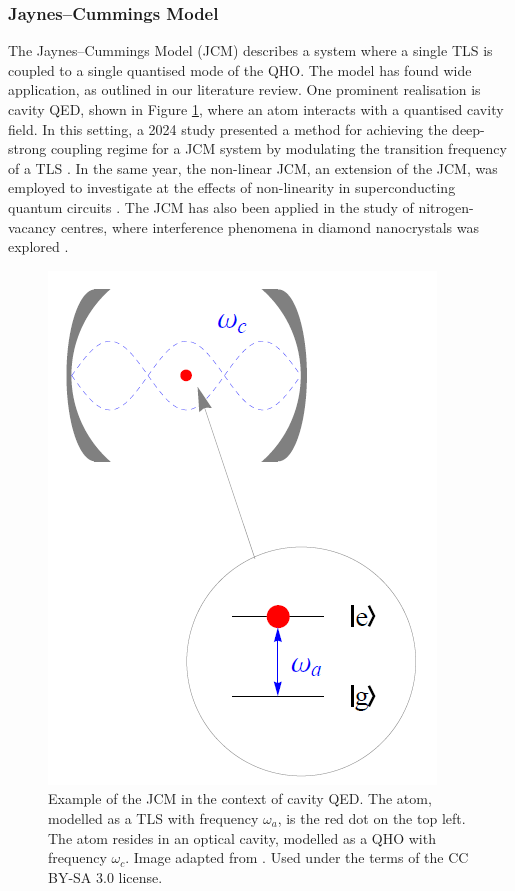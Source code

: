 \documentclass[11pt]{article}
\begin{document}
\subsubsection{Jaynes--Cummings Model} \label{sec:theory_subsub_JCM}

The Jaynes--Cummings Model (JCM) describes a system where a single TLS is coupled to a single quantised mode of the QHO. The model has found wide application, as outlined in our literature review. One prominent realisation is cavity QED, shown in Figure \ref{fig:img_JCM}, where an atom interacts with a quantised cavity field. In this setting, a 2024 study presented a method for achieving the deep-strong coupling regime for a JCM system by modulating the transition frequency of a TLS \cite{Context2024-CQED_JCM}. In the same year, the non-linear JCM, an extension of the JCM, was employed to investigate at the effects of non-linearity in superconducting quantum circuits \cite{Context2024-CircuitQED}. The JCM has also been applied in the study of nitrogen-vacancy centres, where interference phenomena in diamond nanocrystals was explored \cite{Context2009-Alt_NVcentres}. 
\begin{figure}[h]
    \centering
    \includegraphics[scale=0.5]{Images/Jaynes-Cummings_model.png}
    \caption{Example of the JCM in the context of cavity QED. The atom, modelled as a TLS with frequency $\omega_a$, is the red dot on the top left. The atom resides in an optical cavity, modelled as a QHO with frequency $\omega_c$. Image adapted from \cite{Image-Prince_JCM}. Used under the terms of the CC BY-SA 3.0 license.}
    \label{fig:img_JCM}
\end{figure}
\end{document}
